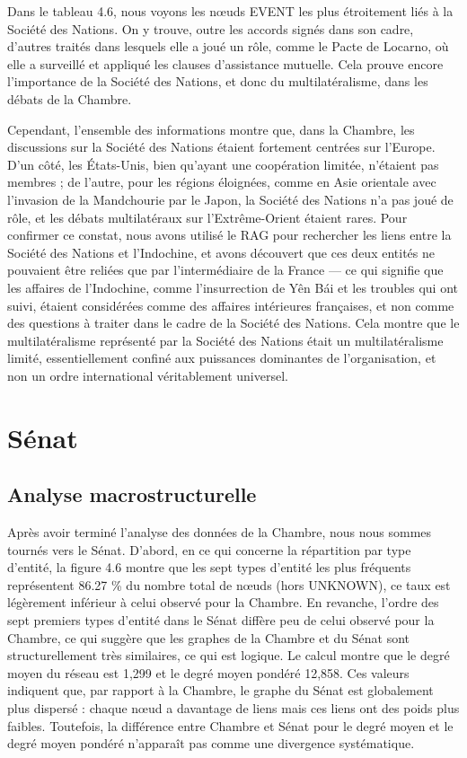 \documentclass[a4paper,twoside,12pt]{book}
\begin{document}
Dans le tableau 4.6, nous voyons les nœuds EVENT les plus étroitement liés à la Société des Nations. On y trouve, outre les accords signés dans son cadre, d'autres traités dans lesquels elle a joué un rôle, comme le Pacte de Locarno, où elle a surveillé et appliqué les clauses d'assistance mutuelle. Cela prouve encore l'importance de la Société des Nations, et donc du multilatéralisme, dans les débats de la Chambre.

Cependant, l'ensemble des informations montre que, dans la Chambre, les discussions sur la Société des Nations étaient fortement centrées sur l'Europe. D'un côté, les États-Unis, bien qu'ayant une coopération limitée, n'étaient pas membres ; de l'autre, pour les régions éloignées, comme en Asie orientale avec l'invasion de la Mandchourie par le Japon, la Société des Nations n'a pas joué de rôle, et les débats multilatéraux sur l'Extrême-Orient étaient rares. Pour confirmer ce constat, nous avons utilisé le RAG pour rechercher les liens entre la Société des Nations et l'Indochine, et avons découvert que ces deux entités ne pouvaient être reliées que par l'intermédiaire de la France — ce qui signifie que les affaires de l'Indochine, comme l'insurrection de Yên Bái et les troubles qui ont suivi, étaient considérées comme des affaires intérieures françaises, et non comme des questions à traiter dans le cadre de la Société des Nations. Cela montre que le multilatéralisme représenté par la Société des Nations était un multilatéralisme limité, essentiellement confiné aux puissances dominantes de l'organisation, et non un ordre international véritablement universel.

\section{Sénat}

\subsection{Analyse macrostructurelle}


Après avoir terminé l'analyse des données de la Chambre, nous nous sommes tournés vers le Sénat. D'abord, en ce qui concerne la répartition par type d'entité, la figure 4.6 montre que les sept types d'entité les plus fréquents représentent 86.27 \% du nombre total de nœuds (hors UNKNOWN), ce taux est légèrement inférieur à celui observé pour la Chambre. En revanche, l'ordre des sept premiers types d'entité dans le Sénat diffère peu de celui observé pour la Chambre, ce qui suggère que les graphes de la Chambre et du Sénat sont structurellement très similaires, ce qui est logique. Le calcul montre que le degré moyen du réseau est 1,299 et le degré moyen pondéré 12,858. Ces valeurs indiquent que, par rapport à la Chambre, le graphe du Sénat est globalement plus dispersé : chaque nœud a davantage de liens mais ces liens ont des poids plus faibles. Toutefois, la différence entre Chambre et Sénat pour le degré moyen et le degré moyen pondéré n'apparaît pas comme une divergence systématique.
\end{document}
